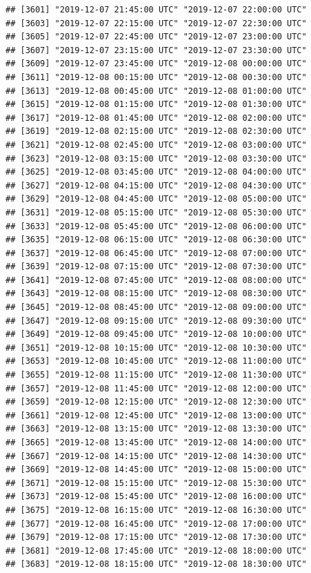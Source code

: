 \documentclass{article}\usepackage[]{graphicx}\usepackage[]{color}
\makeatletter
\newenvironment{kframe}{%
 \def\at@end@of@kframe{}%
 \ifinner\ifhmode%
  \def\at@end@of@kframe{\end{minipage}}%
  \begin{minipage}{\columnwidth}%
 \fi\fi%
 \def\FrameCommand##1{\hskip\@totalleftmargin \hskip-\fboxsep
 \colorbox{shadecolor}{##1}\hskip-\fboxsep
     \hskip-\linewidth \hskip-\@totalleftmargin \hskip\columnwidth}%
 \MakeFramed {\advance\hsize-\width
   \@totalleftmargin\z@ \linewidth\hsize
   \@setminipage}}%
 {\par\unskip\endMakeFramed%
 \at@end@of@kframe}
\newenvironment{knitrout}{}{} %
\makeatother
\begin{document}
\begin{knitrout}
\begin{kframe}
\begin{verbatim}
## [3601] "2019-12-07 21:45:00 UTC" "2019-12-07 22:00:00 UTC"
## [3603] "2019-12-07 22:15:00 UTC" "2019-12-07 22:30:00 UTC"
## [3605] "2019-12-07 22:45:00 UTC" "2019-12-07 23:00:00 UTC"
## [3607] "2019-12-07 23:15:00 UTC" "2019-12-07 23:30:00 UTC"
## [3609] "2019-12-07 23:45:00 UTC" "2019-12-08 00:00:00 UTC"
## [3611] "2019-12-08 00:15:00 UTC" "2019-12-08 00:30:00 UTC"
## [3613] "2019-12-08 00:45:00 UTC" "2019-12-08 01:00:00 UTC"
## [3615] "2019-12-08 01:15:00 UTC" "2019-12-08 01:30:00 UTC"
## [3617] "2019-12-08 01:45:00 UTC" "2019-12-08 02:00:00 UTC"
## [3619] "2019-12-08 02:15:00 UTC" "2019-12-08 02:30:00 UTC"
## [3621] "2019-12-08 02:45:00 UTC" "2019-12-08 03:00:00 UTC"
## [3623] "2019-12-08 03:15:00 UTC" "2019-12-08 03:30:00 UTC"
## [3625] "2019-12-08 03:45:00 UTC" "2019-12-08 04:00:00 UTC"
## [3627] "2019-12-08 04:15:00 UTC" "2019-12-08 04:30:00 UTC"
## [3629] "2019-12-08 04:45:00 UTC" "2019-12-08 05:00:00 UTC"
## [3631] "2019-12-08 05:15:00 UTC" "2019-12-08 05:30:00 UTC"
## [3633] "2019-12-08 05:45:00 UTC" "2019-12-08 06:00:00 UTC"
## [3635] "2019-12-08 06:15:00 UTC" "2019-12-08 06:30:00 UTC"
## [3637] "2019-12-08 06:45:00 UTC" "2019-12-08 07:00:00 UTC"
## [3639] "2019-12-08 07:15:00 UTC" "2019-12-08 07:30:00 UTC"
## [3641] "2019-12-08 07:45:00 UTC" "2019-12-08 08:00:00 UTC"
## [3643] "2019-12-08 08:15:00 UTC" "2019-12-08 08:30:00 UTC"
## [3645] "2019-12-08 08:45:00 UTC" "2019-12-08 09:00:00 UTC"
## [3647] "2019-12-08 09:15:00 UTC" "2019-12-08 09:30:00 UTC"
## [3649] "2019-12-08 09:45:00 UTC" "2019-12-08 10:00:00 UTC"
## [3651] "2019-12-08 10:15:00 UTC" "2019-12-08 10:30:00 UTC"
## [3653] "2019-12-08 10:45:00 UTC" "2019-12-08 11:00:00 UTC"
## [3655] "2019-12-08 11:15:00 UTC" "2019-12-08 11:30:00 UTC"
## [3657] "2019-12-08 11:45:00 UTC" "2019-12-08 12:00:00 UTC"
## [3659] "2019-12-08 12:15:00 UTC" "2019-12-08 12:30:00 UTC"
## [3661] "2019-12-08 12:45:00 UTC" "2019-12-08 13:00:00 UTC"
## [3663] "2019-12-08 13:15:00 UTC" "2019-12-08 13:30:00 UTC"
## [3665] "2019-12-08 13:45:00 UTC" "2019-12-08 14:00:00 UTC"
## [3667] "2019-12-08 14:15:00 UTC" "2019-12-08 14:30:00 UTC"
## [3669] "2019-12-08 14:45:00 UTC" "2019-12-08 15:00:00 UTC"
## [3671] "2019-12-08 15:15:00 UTC" "2019-12-08 15:30:00 UTC"
## [3673] "2019-12-08 15:45:00 UTC" "2019-12-08 16:00:00 UTC"
## [3675] "2019-12-08 16:15:00 UTC" "2019-12-08 16:30:00 UTC"
## [3677] "2019-12-08 16:45:00 UTC" "2019-12-08 17:00:00 UTC"
## [3679] "2019-12-08 17:15:00 UTC" "2019-12-08 17:30:00 UTC"
## [3681] "2019-12-08 17:45:00 UTC" "2019-12-08 18:00:00 UTC"
## [3683] "2019-12-08 18:15:00 UTC" "2019-12-08 18:30:00 UTC"

\end{verbatim}
\end{kframe}
\end{knitrout}
\end{document}
